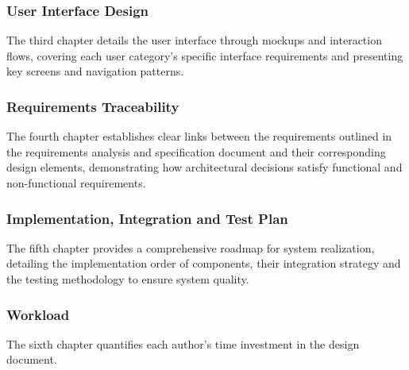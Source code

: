 \subsubsection{User Interface Design}
The third chapter details the user interface through mockups and interaction flows, covering each user category's specific interface requirements and presenting key screens and navigation patterns.

\subsubsection{Requirements Traceability}
The fourth chapter establishes clear links between the requirements outlined in the requirements analysis and specification document \cite{carraracurrodossi2024} and their corresponding design elements, demonstrating how architectural decisions satisfy functional and non-functional requirements.

\subsubsection{Implementation, Integration and Test Plan}
The fifth chapter provides a comprehensive roadmap for system realization, detailing the implementation order of components, their integration strategy and the testing methodology to ensure system quality.

\subsubsection{Workload}
The sixth chapter quantifies each author's time investment in the design document.
